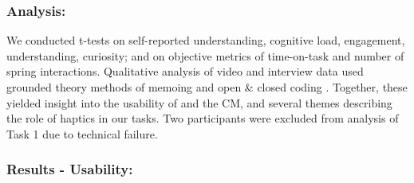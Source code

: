 \subsubsection{Analysis:}
We conducted t-tests on self-reported understanding, cognitive load, engagement, understanding, curiosity; and on objective metrics of time-on-task and number of spring interactions.
Qualitative analysis of video and interview data used grounded theory methods of memoing and open \& closed coding \cite{Corbin2008}.
Together, these  yielded insight into the usability of \SpringSim and the \HandsOn CM, and several themes %
describing the role of haptics in our tasks. Two participants were excluded from analysis of Task 1 due to technical failure. %




 
 
\subsubsection{Results - Usability:}
%


